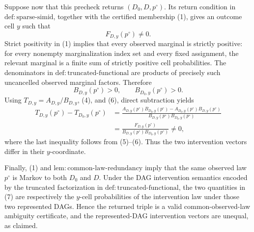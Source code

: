 Suppose now that this precheck returns \((D_0,D,p^{\circ})\).  Its return condition in \(\mathrm{def{:}sparse\text{-}simid}\), together with the certified membership (1), gives an outcome cell \(y\) such that
\[
 F_{D,y}(p^{\circ})\ne 0. \tag{5}
\]
Strict positivity in (1) implies that every observed marginal is strictly positive: for every nonempty marginalization index set and every fixed assignment, the relevant marginal is a finite sum of strictly positive cell probabilities.  The denominators in \(\mathrm{def{:}truncated\text{-}functional}\) are products of precisely such uncancelled observed marginal factors.  Therefore
\[
 B_{D,y}(p^{\circ})>0,
 \qquad B_{D_0,y}(p^{\circ})>0. \tag{6}
\]
Using \(T_{D,y}=A_{D,y}/B_{D,y}\), (4), and (6), direct subtraction yields
\[
 \begin{aligned}
 T_{D,y}(p^{\circ})-T_{D_0,y}(p^{\circ})
 &=\frac{A_{D,y}(p^{\circ})B_{D_0,y}(p^{\circ})
          -A_{D_0,y}(p^{\circ})B_{D,y}(p^{\circ})}
         {B_{D,y}(p^{\circ})B_{D_0,y}(p^{\circ})}\\
 &=\frac{F_{D,y}(p^{\circ})}
         {B_{D,y}(p^{\circ})B_{D_0,y}(p^{\circ})}
 \ne 0, \tag{7}
 \end{aligned}
\]
where the last inequality follows from (5)--(6).  Thus the two intervention vectors differ in their \(y\)-coordinate.

Finally, (1) and \(\mathrm{lem{:}common\text{-}law\text{-}redundancy}\) imply that the same observed law \(p^{\circ}\) is Markov to both \(D_0\) and \(D\).  Under the DAG intervention semantics encoded by the truncated factorization in \(\mathrm{def{:}truncated\text{-}functional}\), the two quantities in (7) are respectively the \(y\)-cell probabilities of the intervention law under those two represented DAGs.  Hence the returned triple is a valid common-observed-law ambiguity certificate, and the represented-DAG intervention vectors are unequal, as claimed.
